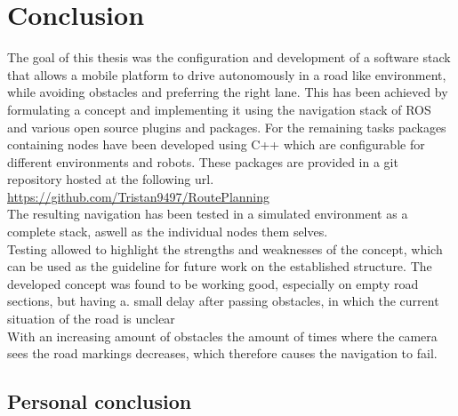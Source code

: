 \chapter{Conclusion}
\label{Conclusion}
The goal of this thesis was the configuration and development of a software stack that allows a mobile platform to drive autonomously in a road like environment, while avoiding obstacles and preferring the right lane.
This has been achieved by formulating a concept and implementing it using the navigation stack of ROS and various open source plugins and packages.
For the remaining tasks packages containing nodes have been developed using C++ which are configurable for different environments and robots. These packages are provided in a git repository hosted at the following url.\\

\url{https://github.com/Tristan9497/RoutePlanning}\\

The resulting navigation has been tested in a simulated environment as a complete stack, aswell as the individual nodes them selves.\\

Testing allowed to highlight the strengths and weaknesses of the concept, which can be used as the guideline for future work on the established structure. The developed concept was found to be working good, especially on empty road sections, but having a. small delay after passing obstacles, in which the current situation of the road is unclear\\

With an increasing amount of obstacles the amount of times where the camera sees the road markings decreases, which therefore causes the navigation to fail.


\section{Personal conclusion}





